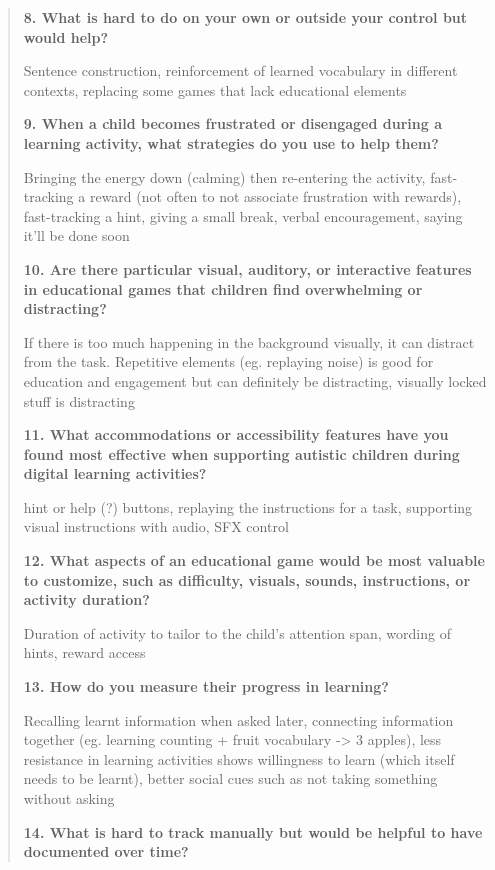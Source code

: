 \documentclass[12pt, titlepage]{article}
\begin{document}
\begin{quote}
\noindent\textbf{8. What is hard to do on your own or outside your control but would help?}

\noindent Sentence construction, reinforcement of learned vocabulary in different contexts, replacing some games that lack educational elements

\noindent\textbf{9. When a child becomes frustrated or disengaged during a learning activity, what strategies do you use to help them?}

\noindent Bringing the energy down (calming) then re-entering the activity, fast-tracking a reward (not often to not associate frustration with rewards), fast-tracking a hint, giving a small break, verbal encouragement, saying it’ll be done soon

\noindent\textbf{10. Are there particular visual, auditory, or interactive features in educational games that children find overwhelming or distracting?}

\noindent If there is too much happening in the background visually, it can distract from the task. Repetitive elements (eg. replaying noise) is good for education and engagement but can definitely be distracting, visually locked stuff is distracting

\noindent\textbf{11. What accommodations or accessibility features have you found most effective when supporting autistic children during digital learning activities?}

\noindent hint or help (?) buttons, replaying the instructions for a task, supporting visual instructions with audio, SFX control

\noindent\textbf{12. What aspects of an educational game would be most valuable to customize, such as difficulty, visuals, sounds, instructions, or activity duration?}

\noindent Duration of activity to tailor to the child’s attention span, wording of hints, reward access

\noindent\textbf{13. How do you measure their progress in learning?}

\noindent Recalling learnt information when asked later, connecting information together (eg. learning counting + fruit vocabulary -> 3 apples), less resistance in learning activities shows willingness to learn (which itself needs to be learnt), better social cues such as not taking something without asking

\noindent\textbf{14. What is hard to track manually but would be helpful to have documented over time?}


\end{quote}
\end{document}
